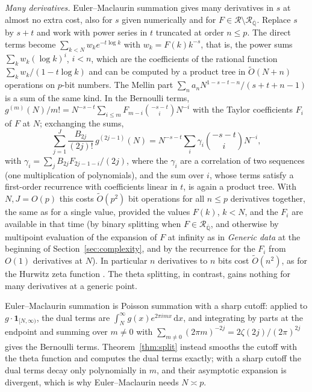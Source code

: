 \documentclass[11pt,reqno]{amsart}
\theoremstyle{definition}
\theoremstyle{remark}
\newcommand{\dd}{\,\mathrm{d}}
\newcommand{\Qbar}{\overline{\mathbb{Q}}}
\newcommand{\Reg}{\mathcal{R}}
\newcommand{\RegQ}{\mathcal{R}_{\Qbar}}
\begin{document}
\emph{Many derivatives.} Euler--Maclaurin summation gives many derivatives in $s$ at almost no extra cost, also for
$s$ given numerically and for $F \in \Reg \setminus \RegQ$. Replace $s$ by $s+t$ and work with power series in
$t$ truncated at order $n \le p$. The direct terms become $\sum_{k<N}w_ke^{-t\log k}$ with $w_k = F(k)k^{-s}$, that
is, the power sums $\sum_kw_k(\log k)^i$, $i < n$, which are the coefficients of the rational function
$\sum_kw_k/(1-t\log k)$ and can be computed by a product tree in $\widetilde O(N + n)$ operations on $p$-bit numbers.
The Mellin part $\sum_na_nN^{1-s-t-n}/(s+t+n-1)$ is a sum of the same kind. In the Bernoulli terms,
$g^{(m)}(N)/m! = N^{-s-t}\sum_{i\le m}F_{m-i}\binom{-s-t}{i}N^{-i}$ with the Taylor coefficients $F_i$ of $F$ at $N$;
exchanging the sums,
\[
  \sum_{j=1}^{J}\frac{B_{2j}}{(2j)!}\,g^{(2j-1)}(N) = N^{-s-t}\sum_{i}\gamma_i\binom{-s-t}{i}N^{-i},
\]
with $\gamma_i = \sum_jB_{2j}F_{2j-1-i}/(2j)$,
where the $\gamma_i$ are a correlation of two sequences (one multiplication of polynomials), and the sum over $i$, whose
terms satisfy a first-order recurrence with coefficients linear in $t$, is again a product tree. With $N, J = O(p)$
this costs $\widetilde O(p^2)$ bit operations for all $n \le p$ derivatives together, the same as for a single value,
provided the values $F(k)$, $k < N$, and the $F_i$ are available in that time (by binary splitting when
$F \in \RegQ$, and otherwise by multipoint evaluation of the expansion of $F$ at infinity as in \emph{Generic data} at the
beginning of Section~\ref{sec:complexity}, and by the recurrence for the $F_i$ from $O(1)$ derivatives at $N$). In particular $n$ derivatives
to $n$ bits cost $\widetilde O(n^2)$, as for the Hurwitz zeta function \cite{Joh15}. The theta splitting, in contrast,
gains nothing for many derivatives at a generic point.

Euler--Maclaurin summation is Poisson summation with a sharp cutoff: applied to $g\cdot\mathbf{1}_{[N,\infty)}$, the
dual terms are $\int_N^\infty g(x)e^{2\pi imx}\dd x$, and integrating by parts at the endpoint and summing over $m \ne 0$ with
$\sum_{m\ne0}(2\pi m)^{-2j} = 2\zeta(2j)/(2\pi)^{2j}$ gives the Bernoulli terms. Theorem~\ref{thm:split} instead smooths
the cutoff with the theta function and computes the dual terms exactly; with a sharp cutoff the dual terms decay only
polynomially in $m$, and their asymptotic expansion is divergent, which is why Euler--Maclaurin needs $N \asymp p$.
\end{document}
